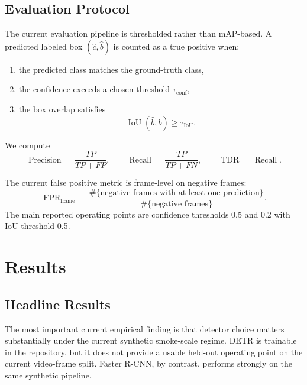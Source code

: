 \documentclass[11pt]{article}
\begin{document}
\subsection{Evaluation Protocol}
The current evaluation pipeline is thresholded rather than mAP-based. A predicted labeled box $(\hat{c}, \hat{b})$ is counted as a true positive when:
\begin{enumerate}[leftmargin=1.5em]
    \item the predicted class matches the ground-truth class,
    \item the confidence exceeds a chosen threshold $\tau_{\mathrm{conf}}$,
    \item the box overlap satisfies
    \[
    \operatorname{IoU}(\hat{b}, b)\ge \tau_{\mathrm{IoU}}.
    \]
\end{enumerate}

We compute
\[
\operatorname{Precision}=\frac{TP}{TP+FP},
\qquad
\operatorname{Recall}=\frac{TP}{TP+FN},
\qquad
\operatorname{TDR}=\operatorname{Recall}.
\]

The current false positive metric is frame-level on negative frames:
\[
\operatorname{FPR}_{\mathrm{frame}}
=
\frac{\#\{\text{negative frames with at least one prediction}\}}
{\#\{\text{negative frames}\}}.
\]
The main reported operating points are confidence thresholds 0.5 and 0.2 with IoU threshold 0.5.

\section{Results}
\subsection{Headline Results}
The most important current empirical finding is that detector choice matters substantially under the current synthetic smoke-scale regime. DETR is trainable in the repository, but it does not provide a usable held-out operating point on the current video-frame split. Faster R-CNN, by contrast, performs strongly on the same synthetic pipeline.

\begin{table}[H]
    \centering
    \caption{Current main local baseline run on \texttt{video\_frame\_smoke\_v5}.}
\end{table}
\end{document}
